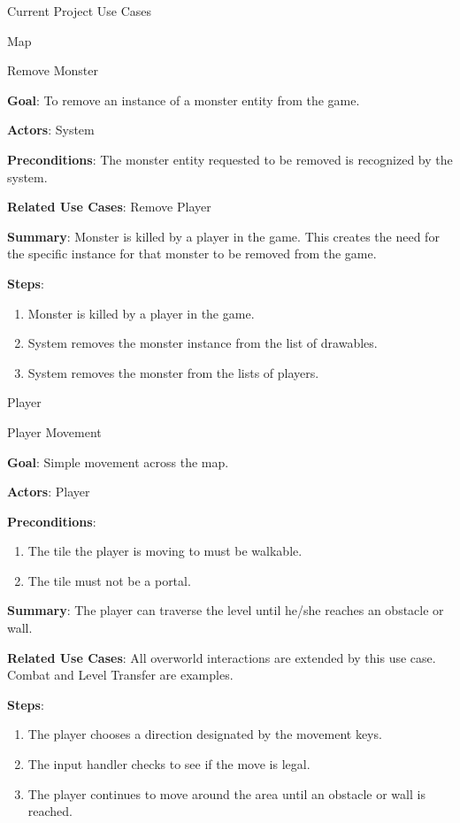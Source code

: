 \documentclass[12pt]{report}
\begin{document}
\begin{chapter}{Current Project Use Cases}
\begin{section}{Map}
    \begin{subsection}{Remove Monster}

      \textbf{Goal}: 
      To remove an instance of a monster entity from the game.

      \textbf{Actors}: 
      System

      \textbf{Preconditions}: 
      The monster entity requested to be removed is recognized by the system.

      \textbf{Related Use Cases}: 
      Remove Player

      \textbf{Summary}: 
      Monster is killed by a player in the game. This creates the need for the specific instance for that monster to be removed from the game.

      \textbf{Steps}:
      \begin{enumerate}
	\item Monster is killed by a player in the game.
	\item System removes the monster instance from the list of drawables.
	\item System removes the monster from the lists of players.
      \end{enumerate}
    \end{subsection}
  \end{section}
  
  \begin{section}{Player}
    \begin{subsection}{Player Movement}
      
      \textbf{Goal}:
      Simple movement across the map.
      
      \textbf{Actors}:
      Player
      
      \textbf{Preconditions}:
      \begin{enumerate}
        \item The tile the player is moving to must be walkable.
        \item The tile must not be a portal.
      \end{enumerate}

      \textbf{Summary}:
      The player can traverse the level until he/she reaches an obstacle or wall.

      \textbf{Related Use Cases}:
      All overworld interactions are extended by this use case. Combat and Level Transfer are 
      examples.

      \textbf{Steps}:
      \begin{enumerate}
        \item The player chooses a direction designated by the movement keys.
        \item The input handler checks to see if the move is legal.
        \item The player continues to move around the area until an obstacle or wall is reached.
      \end{enumerate}
    \end{subsection}


\end{section}
\end{chapter}
\end{document}
